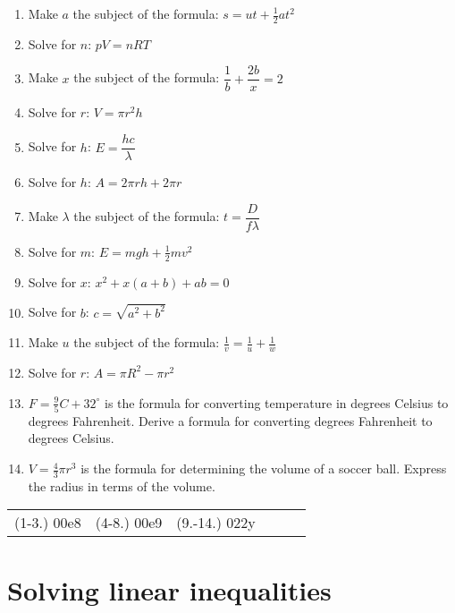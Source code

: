 \begin{exercises}{}
{
\begin{enumerate}[itemsep=5pt, label=\textbf{\arabic*}. ] 
\item Make $a$ the subject of the formula: $s=ut+\frac{1}{2}at^{2}$
\item Solve for $n$: $pV=nRT$ 
\item Make $x$ the subject of the formula: $\dfrac{1}{b}+\dfrac{2b}{x}=2$
\item Solve for $r$: $V = \pi r^{2} h$
\item Solve for $h$: $E=\dfrac{hc}{\lambda}$
\item Solve for $h$: $A=2\pi rh + 2 \pi r$
\item Make $\lambda$ the subject of the formula: $t=\dfrac{D}{f \lambda}$
\item Solve for $m$: $E=mgh + \frac{1}{2}mv^{2}$
\item Solve for $x$: $x^2+x(a+b)+ab=0$
\item Solve for $b$: $c=\sqrt{a^2+b^2}$
\item Make $u$ the subject of the formula: $\frac{1}{v}=\frac{1}{u}+\frac{1}{w}$
\item Solve for $r$: $A=\pi R^2 -\pi r^2$
\item $F=\frac{9}{5}C + 32^\circ$ is the formula for converting temperature in degrees Celsius to degrees Fahrenheit. Derive a formula for converting degrees Fahrenheit to degrees Celsius.
\item $V=\frac{4}{3}\pi r^3$ is the formula for determining the volume of a soccer ball. Express the radius in terms of the volume.
\end{enumerate}
\practiceinfo
\par 
\par \begin{tabular}[h]{cccccc}
(1-3.) 00e8&   (4-8.) 00e9 & (9.-14.) 022y\end{tabular}
}
\end{exercises}

\section{Solving linear inequalities}
\nopagebreak

